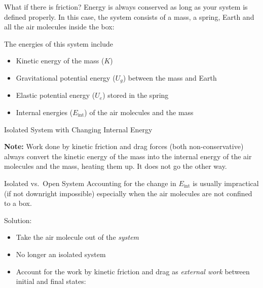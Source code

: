 \documentclass[12pt,compress,aspectratio=169]{beamer}
\begin{document}
\begin{frame}{What if there is friction?}
  Energy is always conserved as long as your system is defined properly. In
  this case, the system consists of a mass, a spring, Earth and all the air
  molecules inside the box:
  
  The energies of this system include
  \begin{itemize}
  \item Kinetic energy of the mass ($K$)
  \item Gravitational potential energy ($U_g$) between the mass and Earth
  \item Elastic potential energy ($U_e$) stored in the spring
  \item Internal energies ($E_\text{int}$) of the air molecules and the mass
  \end{itemize}
\end{frame}



\begin{frame}{Isolated System with Changing Internal Energy}
  
  
  
  \textbf{Note:} Work done by kinetic friction and drag forces (both
  non-conservative) always convert the kinetic energy of the mass into the
  internal energy of the air molecules and the mass, heating them up. It does
  not go the other way.
\end{frame}



\begin{frame}{Isolated vs.\ Open System}
  Accounting for the change in $E_\text{int}$ is usually impractical (if not
  downright impossible) especially when the air molecules are not confined to
  a box.
  \begin{center}
  \end{center}
  \vspace{-.05in}Solution:
  \begin{itemize}
  \item Take the air molecule out of the \emph{system}
  \item No longer an isolated system
  \item Account for the work by kinetic friction and drag as
    \emph{external work} between initial and final states:

  \end{itemize}
\end{frame}
\end{document}
